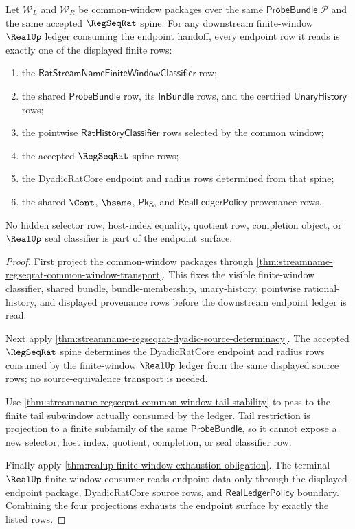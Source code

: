 \begin{theorem}
\label{thm:streamname-regseqrat-common-window-endpoint-exhaustion}
Let $\mathcal W_L$ and $\mathcal W_R$ be common-window packages over the same
$\mathsf{ProbeBundle}$ $\mathcal P$ and the same accepted $\RegSeqRat$ spine.
For any downstream finite-window $\RealUp$ ledger consuming the endpoint
handoff, every endpoint row it reads is exactly one of the displayed finite
rows:
\begin{enumerate}
  \item the $\mathsf{RatStreamNameFiniteWindowClassifier}$ row;
  \item the shared $\mathsf{ProbeBundle}$ row, its $\mathsf{InBundle}$ rows,
  and the certified $\mathsf{UnaryHistory}$ rows;
  \item the pointwise $\mathsf{RatHistoryClassifier}$ rows selected by the
  common window;
  \item the accepted $\RegSeqRat$ spine rows;
  \item the DyadicRatCore endpoint and radius rows determined from that spine;
  \item the shared $\Cont$, $\hsame$, $\mathsf{Pkg}$, and
  $\mathsf{RealLedgerPolicy}$ provenance rows.
\end{enumerate}
No hidden selector row, host-index equality, quotient row, completion object,
or $\RealUp$ seal classifier is part of the endpoint surface.
\end{theorem}
\begin{proof}
First project the common-window packages through
\autoref{thm:streamname-regseqrat-common-window-transport}. This fixes the
visible finite-window classifier, shared bundle, bundle-membership,
unary-history, pointwise rational-history, and displayed provenance rows before
the downstream endpoint ledger is read.

Next apply \autoref{thm:streamname-regseqrat-dyadic-source-determinacy}. The
accepted $\RegSeqRat$ spine determines the DyadicRatCore endpoint and radius
rows consumed by the finite-window $\RealUp$ ledger from the same displayed
source rows; no source-equivalence transport is needed.

Use \autoref{thm:streamname-regseqrat-common-window-tail-stability} to pass to
the finite tail subwindow actually consumed by the ledger. Tail restriction is
projection to a finite subfamily of the same $\mathsf{ProbeBundle}$, so it
cannot expose a new selector, host index, quotient, completion, or seal
classifier row.

Finally apply \autoref{thm:realup-finite-window-exhaustion-obligation}. The
terminal $\RealUp$ finite-window consumer reads endpoint data only through the
displayed endpoint package, DyadicRatCore source rows, and
$\mathsf{RealLedgerPolicy}$ boundary. Combining the four projections exhausts
the endpoint surface by exactly the listed rows.
\end{proof}

